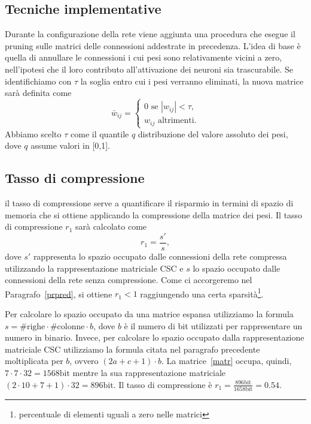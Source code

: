 \documentclass[11pt,a4paper,twoside,
openright]{book}
\begin{document}
\subsection{Tecniche implementative}
\label{percentile}
Durante la configurazione della rete viene aggiunta una procedura che esegue il pruning sulle matrici delle connessioni addestrate in precedenza. L'idea di base è quella di annullare le connessioni i cui pesi sono relativamente vicini a zero, nell'ipotesi che il loro contributo all'attivazione dei neuroni sia trascurabile. Se identifichiamo con $\tau$ la soglia entro cui i pesi verranno eliminati, la nuova matrice sarà definita come
\begin{equation}
\bar{w}_{ij}=
\begin{cases}
0 \text{ se } |w_{ij}|<\tau, \\
w_{ij} \text{ altrimenti}.
\end{cases}
\label{pruning}
\end{equation}
Abbiamo scelto $\tau$ come il quantile $q$  distribuzione del valore assoluto dei pesi, dove $q$ assume valori in [0,1].

\subsection{Tasso di compressione}
\label{sectassopr}
il tasso di compressione serve a quantificare il risparmio in termini di spazio di memoria che si ottiene applicando la compressione della matrice dei pesi.
Il tasso di compressione $r_1$ sarà calcolato come
\begin{equation}
r_1=\frac{s'}{s},
\label{tassopr}
\end{equation}
dove $s'$ rappresenta lo spazio occupato dalle connessioni della rete compressa utilizzando la rappresentazione matriciale CSC e $s$ lo spazio occupato dalle connessioni della rete senza compressione.
Come ci accorgeremo nel Paragrafo~\ref{prpred}, si ottiene $r_1<1$ raggiungendo una certa sparsità\footnote{percentuale di elementi uguali a zero nelle matrici}.

Per calcolare lo spazio occupato da una matrice espansa utilizziamo la formula $s=\mathrm{\#righe} \cdot \mathrm{\#colonne} \cdot b$, dove $b$ è il numero di bit utilizzati per rappresentare un numero in binario.
Invece, per calcolare lo spazio occupato dalla rappresentazione matriciale CSC utilizziamo la formula citata nel paragrafo precedente moltiplicata per $b$, ovvero $(2a+c+1)\cdot b$.
La matrice~\ref{matr} occupa, quindi, $7 \cdot 7 \cdot 32 = 1568 \mathrm{bit}$ mentre la sua rappresentazione matriciale $(2\cdot10+7+1)\cdot32=896\mathrm{bit}$. Il tasso di compressione è $r_1=\frac{896\mathrm{bit}}{1658\mathrm{bit}}=0.54$.
\end{document}
